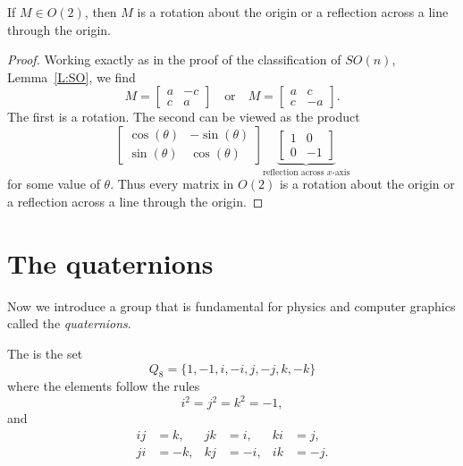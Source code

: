 \documentclass{ximera}
\begin{document}
\begin{theorem}
  If $M\in O(2)$, then $M$ is a rotation about the origin or a
  reflection across a line through the origin.
  \begin{proof}
    Working exactly as in the proof of the classification of $SO(n)$,
    Lemma~\ref{L:SO}, we find
    \[
    M = \begin{bmatrix}
      a & -c \\
      c & a
    \end{bmatrix} \quad\text{or}\quad
    M = \begin{bmatrix}
      a & c \\
      c & -a
    \end{bmatrix}.
    \]
    The first is a rotation. The second can be viewed as the product
    \[
    \begin{bmatrix}
      \cos(\theta) & -\sin(\theta) \\
      \sin(\theta) & \cos(\theta)
    \end{bmatrix}
    \underbrace{\begin{bmatrix}
      1 & 0 \\
      0 & -1
    \end{bmatrix}}_{\text{reflection across $x$-axis}}
    \]
    for some value of $\theta$. Thus every matrix in $O(2)$ is a
    rotation about the origin or a reflection across a line through
    the origin.
  \end{proof}
\end{theorem}






\section{The quaternions}

Now we introduce a group that is fundamental for physics and computer
graphics called the \textit{quaternions}.

\begin{definition}
The  is the set
\[
Q_8 = \{1,-1,i,-i,j,-j,k,-k\}
\]
where the elements follow the rules
  \[
  i^2 = j^2 = k^2 = -1,
  \]
and
\begin{align*}
  ij &= k,  & jk &= i, & ki &= j, \\
  ji &= -k, & kj &= -i, & ik &= -j. \\
\end{align*}
\end{definition}
\end{document}
